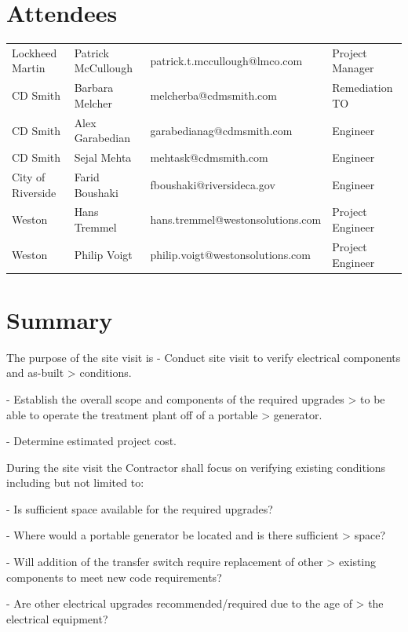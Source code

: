 \documentclass{article}
\begin{document}
\section*{Attendees}
\begin{table}[h]
  \label{tab:label}
  \begin{tabular}{l l l l}
      Lockheed Martin & Patrick McCullough & patrick.t.mccullough@lmco.com & Project Manager \\
      CD Smith & Barbara Melcher & melcherba@cdmsmith.com & Remediation TO \\
      CD Smith & Alex Garabedian & garabedianag@cdmsmith.com & Engineer \\
      CD Smith & Sejal Mehta & mehtask@cdmsmith.com & Engineer \\
      City of Riverside & Farid Boushaki  & fboushaki@riversideca.gov & Engineer \\
      Weston & Hans Tremmel & hans.tremmel@westonsolutions.com & Project Engineer \\
      Weston & Philip Voigt & philip.voigt@westonsolutions.com & Project Engineer \\
  \end{tabular}
\end{table}

\section*{Summary}

The purpose of the site visit is 
-   Conduct site visit to verify electrical components and as-built
    > conditions.

-   Establish the overall scope and components of the required upgrades
    > to be able to operate the treatment plant off of a portable
    > generator.

-   Determine estimated project cost.

During the site visit the Contractor
shall focus on verifying existing conditions including but not limited
to:

-   Is sufficient space available for the required upgrades?

-   Where would a portable generator be located and is there sufficient
    > space?

-   Will addition of the transfer switch require replacement of other
    > existing components to meet new code requirements?

-   Are other electrical upgrades recommended/required due to the age of
    > the electrical equipment?
\end{document}
